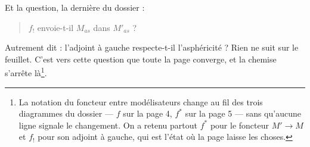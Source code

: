 \documentclass[11pt,a4paper]{article}
\begin{document}

Et la question, la dernière du dossier :
\begin{quote}
$f_{!}$ envoie-t-il $M_{as}$ dans $M'_{as}$ ?
\end{quote}

Autrement dit : l'adjoint à gauche respecte-t-il l'asphéricité ? Rien ne suit
sur le feuillet. C'est vers cette question que toute la page converge, et la
chemise s'arrête là\footnote{La notation du foncteur entre modélisateurs change
au fil des trois diagrammes du dossier — $f$ sur la page 4, $f^{*}$ sur la page
5 — sans qu'aucune ligne signale le changement. On a retenu partout $f^{*}$ pour
le foncteur $M' \to M$ et $f_{!}$ pour son adjoint à gauche, qui est l'état où
la page laisse les choses.}.
\end{document}
